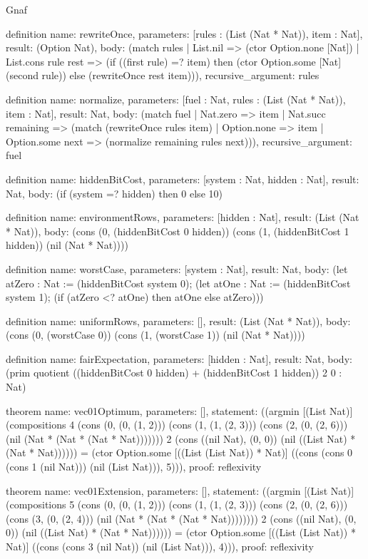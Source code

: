 \begin{lexlean}{Gnaf}
\begin{semanticmodule}
definition{
  name: rewriteOnce,
  parameters: [rules : (List (Nat * Nat)), item : Nat],
  result: (Option Nat),
  body: (match rules
    | List.nil => (ctor Option.none [Nat])
    | List.cons rule rest => (if ((first rule) =? item) then (ctor Option.some [Nat] (second rule)) else (rewriteOnce rest item))),
  recursive_argument: rules
}

definition{
  name: normalize,
  parameters: [fuel : Nat, rules : (List (Nat * Nat)), item : Nat],
  result: Nat,
  body: (match fuel
    | Nat.zero => item
    | Nat.succ remaining => (match (rewriteOnce rules item)
      | Option.none => item
      | Option.some next => (normalize remaining rules next))),
  recursive_argument: fuel
}

definition{
  name: hiddenBitCost,
  parameters: [system : Nat, hidden : Nat],
  result: Nat,
  body: (if (system =? hidden) then 0 else 10)
}

definition{
  name: environmentRows,
  parameters: [hidden : Nat],
  result: (List (Nat * Nat)),
  body: (cons (0, (hiddenBitCost 0 hidden)) (cons (1, (hiddenBitCost 1 hidden)) (nil (Nat * Nat))))
}

definition{
  name: worstCase,
  parameters: [system : Nat],
  result: Nat,
  body: (let atZero : Nat := (hiddenBitCost system 0); (let atOne : Nat := (hiddenBitCost system 1); (if (atZero <? atOne) then atOne else atZero)))
}

definition{
  name: uniformRows,
  parameters: [],
  result: (List (Nat * Nat)),
  body: (cons (0, (worstCase 0)) (cons (1, (worstCase 1)) (nil (Nat * Nat))))
}

definition{
  name: fairExpectation,
  parameters: [hidden : Nat],
  result: Nat,
  body: (prim quotient ((hiddenBitCost 0 hidden) + (hiddenBitCost 1 hidden)) 2 0 : Nat)
}

theorem{
  name: vec01Optimum,
  parameters: [],
  statement: ((argmin [(List Nat)] (compositions 4 (cons (0, (0, (1, 2))) (cons (1, (1, (2, 3))) (cons (2, (0, (2, 6))) (nil (Nat * (Nat * (Nat * Nat))))))) 2 (cons ((nil Nat), (0, 0)) (nil ((List Nat) * (Nat * Nat)))))) = (ctor Option.some [((List (List Nat)) * Nat)] ((cons (cons 0 (cons 1 (nil Nat))) (nil (List Nat))), 5))),
  proof: reflexivity{}
}

theorem{
  name: vec01Extension,
  parameters: [],
  statement: ((argmin [(List Nat)] (compositions 5 (cons (0, (0, (1, 2))) (cons (1, (1, (2, 3))) (cons (2, (0, (2, 6))) (cons (3, (0, (2, 4))) (nil (Nat * (Nat * (Nat * Nat)))))))) 2 (cons ((nil Nat), (0, 0)) (nil ((List Nat) * (Nat * Nat)))))) = (ctor Option.some [((List (List Nat)) * Nat)] ((cons (cons 3 (nil Nat)) (nil (List Nat))), 4))),
  proof: reflexivity{}
}


\end{semanticmodule}
\end{lexlean}
